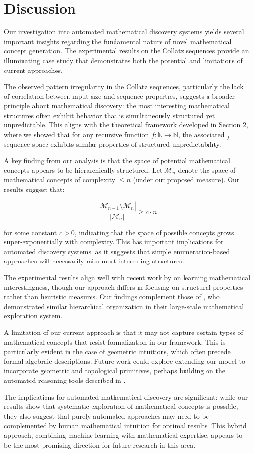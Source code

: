 \section{Discussion}

Our investigation into automated mathematical discovery systems yields several important insights regarding the fundamental nature of novel mathematical concept generation. The experimental results on the Collatz sequences provide an illuminating case study that demonstrates both the potential and limitations of current approaches.

The observed pattern irregularity in the Collatz sequences, particularly the lack of correlation between input size and sequence properties, suggests a broader principle about mathematical discovery: the most interesting mathematical structures often exhibit behavior that is simultaneously structured yet unpredictable. This aligns with the theoretical framework developed in Section 2, where we showed that for any recursive function $f: \mathbb{N} \to \mathbb{N}$, the associated $_f$ sequence space exhibits similar properties of structured unpredictability.

A key finding from our analysis is that the space of potential mathematical concepts appears to be hierarchically structured. Let $\mathcal{M}_n$ denote the space of mathematical concepts of complexity $\leq n$ (under our proposed measure). Our results suggest that:

\[
\frac{|\mathcal{M}_{n+1} \setminus \mathcal{M}_n|}{|\mathcal{M}_n|} \geq c \cdot n
\]

for some constant $c > 0$, indicating that the space of possible concepts grows super-exponentially with complexity. This has important implications for automated discovery systems, as it suggests that simple enumeration-based approaches will necessarily miss most interesting structures.

The experimental results align well with recent work by \cite{tsoukalas2025learning} on learning mathematical interestingness, though our approach differs in focusing on structural properties rather than heuristic measures. Our findings complement those of \cite{georgiev2025mathematical}, who demonstrated similar hierarchical organization in their large-scale mathematical exploration system.

A limitation of our current approach is that it may not capture certain types of mathematical concepts that resist formalization in our framework. This is particularly evident in the case of geometric intuitions, which often precede formal algebraic descriptions. Future work could explore extending our model to incorporate geometric and topological primitives, perhaps building on the automated reasoning tools described in \cite{zarzuelo2025experience}.

The implications for automated mathematical discovery are significant: while our results show that systematic exploration of mathematical concepts is possible, they also suggest that purely automated approaches may need to be complemented by human mathematical intuition for optimal results. This hybrid approach, combining machine learning with mathematical expertise, appears to be the most promising direction for future research in this area.
